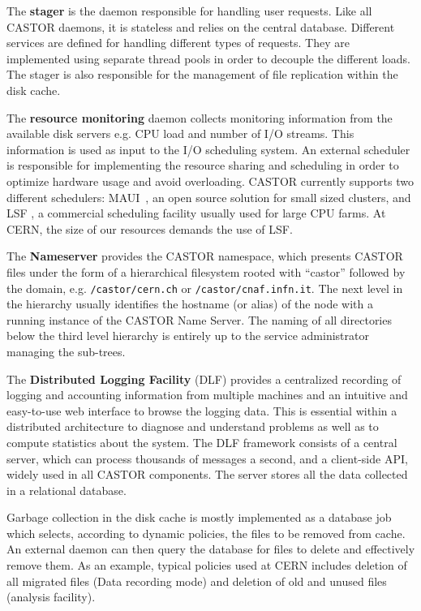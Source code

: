 
The {\bf stager} is the daemon responsible for handling user requests. Like all
CASTOR daemons, it is stateless and relies on the central database.
Different services are defined for handling different types of
requests. They are implemented using separate thread pools in order
to decouple the different loads. The stager is also responsible
for the management of file replication within the disk cache.

The {\bf resource monitoring} daemon collects monitoring information from
the available disk servers e.g. CPU load and number of I/O streams.
This information is used as input to the I/O scheduling system.
An external scheduler is responsible for implementing the resource
sharing and scheduling\cite{msst04} in order to optimize hardware usage
and avoid overloading. CASTOR currently supports two different
schedulers: MAUI~\cite{MAUI}, an open source solution for small
sized clusters, and LSF \cite{LSF}, a commercial
scheduling facility usually used for large CPU farms.
At CERN, the size of our resources demands the use of LSF.

The {\bf Nameserver} provides the CASTOR namespace, which presents
CASTOR files under the form of a hierarchical filesystem rooted
with ``castor'' followed by the domain, e.g. \texttt{/castor/cern.ch}
or \texttt{/castor/cnaf.infn.it}.
The next level in the hierarchy usually identifies the hostname (or alias) of the
node with a running instance of the CASTOR Name Server. The naming of
all directories below the third level hierarchy is entirely up to the
service administrator managing the sub-trees.

The {\bf Distributed Logging Facility} (DLF) provides a centralized recording of
logging and accounting information from multiple machines and
an intuitive and easy-to-use web interface to browse the logging data.
This is essential within a distributed architecture to
diagnose and understand problems as well as to compute statistics
about the system. \label{DLF}
The DLF framework consists of a central server, which can process
thousands of messages a second, and a client-side API, widely used
in all CASTOR components. The server stores all the data collected
in a relational database.

Garbage collection in the disk cache is mostly implemented as a
database job which selects, according to dynamic policies, the
files to be removed from cache. An external daemon can then query
the database for files to delete and effectively remove them.
As an example, typical policies used at CERN includes deletion
of all migrated files (Data recording mode) and deletion of old
and unused files (analysis facility).


